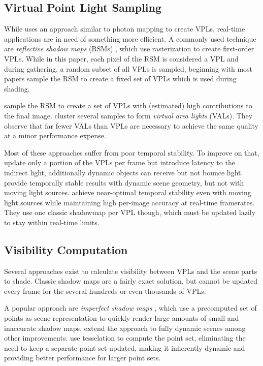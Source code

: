 \subsection{Virtual Point Light Sampling}

While \citet{Keller:1997:InstantRadiosity} uses an approach similar to photon mapping to create VPLs, real-time applications are in need of something more efficient. A commonly used technique are \emph{reflective shadow maps} (RSMs) \citep{Dachsbacher:2005:RSM}, which use rasterization to create first-order VPLs. While in this paper, each pixel of the RSM is considered a VPL and during gathering, a random subset of all VPLs is sampled, beginning with \citet{dachsbacher2006splatting} most papers sample the RSM to create a fixed set of VPLs which is used during shading.

\citet{georgiev2010simple, ritschel2011ismsViewAdaptive} sample the RSM to create a set of VPLs with (estimated) high contributions to the final image. \citet{dong2009real, prutkin2012reflective} cluster several samples to form \emph{virtual area lights} (VALs). They observe that far fewer VALs than VPLs are necessary to achieve the same quality at a minor performance expense.

Most of these approaches suffer from poor temporal stability. To improve on that, \citet{laine2007incremental} update only a portion of the VPLs per frame but introduce latency to the indirect light, additionally dynamic objects can receive but not bounce light. \citet{barak2013temporally} provide temporally stable results with dynamic scene geometry, but not with moving light sources. \citet{hedman2016sequential} achieve near-optimal temporal stability even with moving light sources while maintaining high per-image accuracy at real-time framerates. They use one classic shadowmap per VPL though, which must be updated lazily to stay within real-time limits.


\subsection{Visibility Computation}

Several approaches exist to calculate visibility between VPLs and the scene parts to shade. Classic shadow maps are a fairly exact solution, but cannot be updated every frame for the several hundreds or even thousands of VPLs.

A popular approach are \emph{imperfect shadow maps} \citep[ISMs,][]{ritschel2008ism}, which use a precomputed set of points as scene representation to quickly render large amounts of small and inaccurate shadow maps. \citet{ritschel2011ismsViewAdaptive} extend the approach to fully dynamic scenes among other improvements. \citet{barak2013temporally} use tesselation to compute the point set, eliminating the need to keep a separate point set updated, making it inherently dynamic and providing better performance for larger point sets.

